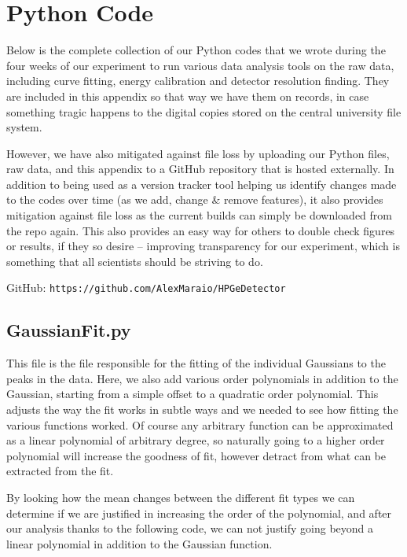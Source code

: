 \documentclass[11pt,a4paper]{article}
\begin{document}
\section{Python Code}
Below is the complete collection of our Python codes that we wrote during the four weeks of our experiment to run various data analysis tools on the raw data, including curve fitting, energy calibration and detector resolution finding. They are included in this appendix so that way we have them on records, in case something tragic happens to the digital copies stored on the central university file system. 

However, we have also mitigated against file loss by uploading our Python files, raw data, and this appendix to a GitHub repository that is hosted externally. In addition to being used as a version tracker tool helping us identify changes made to the codes over time (as we add, change \& remove features), it also provides mitigation against file loss as the current builds can simply be downloaded from the repo again. This also provides an easy way for others to double check figures or results, if they so desire -- improving transparency for our experiment, which is something that all scientists should be striving to do. 

GitHub: \texttt{https://github.com/AlexMaraio/HPGeDetector}


\subsection{GaussianFit.py}
This file is the file responsible for the fitting of the individual Gaussians to the peaks in the data. Here, we also add various order polynomials in addition to the Gaussian, starting from a simple offset to a quadratic order polynomial. This adjusts the way the fit works in subtle ways and we needed to see how fitting the various functions worked. Of course any arbitrary function can be approximated as a linear polynomial of arbitrary degree, so naturally going to a higher order polynomial will increase the goodness of fit, however detract from what can be extracted from the fit. 

By looking how the mean changes between the different fit types we can determine if we are justified in increasing the order of the polynomial, and after our analysis thanks to the following code, we can not justify going beyond a linear polynomial in addition to the Gaussian function.
\end{document}
